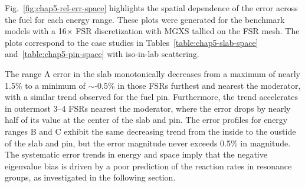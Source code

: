 Fig.~\ref{fig:chap5-rel-err-space} highlights the spatial dependence of the error across the fuel for each energy range. These plots were generated for the benchmark models with a 16$\times$ \ac{FSR} discretization with \ac{MGXS} tallied on the \ac{FSR} mesh. The plots correspond to the case studies in Tables~\ref{table:chap5-slab-space} and~\ref{table:chap5-pin-space} with iso-in-lab scattering.

The range A error in the slab monotonically decreases from a maximum of nearly 1.5\% to a minimum of $\sim$-0.5\% in those \ac{FSR}s furthest and nearest the moderator, with a similar trend observed for the fuel pin. Furthermore,  the trend accelerates in outermost 3--4 \ac{FSR}s nearest the moderator, where the error drops by nearly half of its value at the center of the slab and pin. The error profiles for energy ranges B and C exhibit the same decreasing trend from the inside to the oustide of the slab and pin, but the error magnitude never exceeds 0.5\% in magnitude. The systematic error trends in energy and space imply that the negative eigenvalue bias is driven by a poor prediction of the reaction rates in resonance groups, as investigated in the following section.

